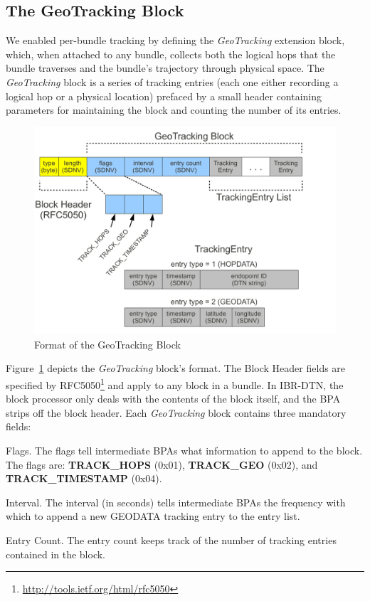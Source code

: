 \subsection{The GeoTracking Block}
We enabled per-bundle tracking by defining the {\em GeoTracking} extension block, which, when attached to any bundle, collects both the logical hops that the bundle traverses and the bundle's trajectory through physical space. The {\em GeoTracking} block is a series of tracking entries (each one either recording a logical hop or a physical location) prefaced by a small header containing parameters for maintaining the block and counting the number of its entries.
\begin{figure}
\begin{center}
\includegraphics[width=.9\columnwidth]{figures/tracking-block.pdf}
\end{center}
\vspace{-.75cm}
\caption{Format of the GeoTracking Block}
\label{fig:tracking-block}
\vspace{-.5cm}
\end{figure}

\begin{sloppypar}
Figure~\ref{fig:tracking-block} depicts the {\em GeoTracking} block's format. The Block Header fields are specified by RFC5050\footnote{\scriptsize\url{http://tools.ietf.org/html/rfc5050}} and apply to any block in a bundle. In IBR-DTN, the block processor only deals with the contents of the block itself, and the BPA strips off the block header. Each {\em GeoTracking} block contains three mandatory fields:
\begin{description*}
  \item[Flags.] The flags tell intermediate BPAs what information to append to the block. The flags are: {\bf TRACK\_HOPS} (0x01), {\bf TRACK\_GEO} (0x02), and {\bf TRACK\_TIMESTAMP} (0x04).
  \item[Interval.] The interval (in seconds) tells intermediate BPAs the frequency with which to append a new GEODATA tracking entry to the entry list.  
  \item[Entry Count.] The entry count keeps track of the number of tracking entries contained in the block.
\end{description*}
\end{sloppypar}


